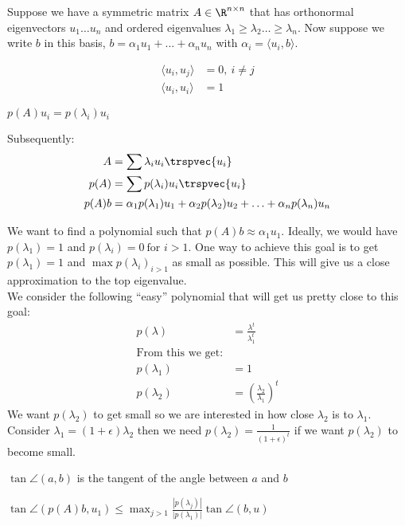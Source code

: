 Suppose we have a symmetric matrix $A \in \R^{n \times n}$ that has orthonormal eigenvectors $u_1 \ldots u_n$ and ordered eigenvalues $\lambda_1 \geq \lambda_2 \ldots \geq \lambda_n$. Now suppose we write $b$ in this basis, $b=\alpha_1 u_1 + ... + \alpha_n u_n$ with $\alpha_i = \langle u_i,b\rangle$. 
\begin{remark}
\begin{align*}
    \langle u_i,u_j\rangle &= 0, \ i \neq j \\
    \langle u_i, u_i\rangle &= 1 
\end{align*}
\end{remark}

\begin{remark}
$p(A)u_i = p(\lambda_i)u_i$
\end{remark}
Subsequently:
\begin{align*}
A &= \sum \lambda_i u_i \trspvec{u_i}  \\
p(A) &= \sum p(\lambda_i) u_i \trspvec{u_i} \\
 p(A)b &= \alpha_1 p(\lambda_1)u_1 + \alpha_2 p(\lambda_2) u_2 + \ldots + \alpha_n p(\lambda_n) u_n 
\end{align*}
 
We want to find a polynomial such that $p(A)b \approx \alpha_1 u_1$. Ideally, we would have $ p(\lambda_1) = 1$ and $ p(\lambda_i) = 0 \ \text{for } i > 1$. One way to achieve this goal is to get $p(\lambda_1) = 1$ and $\max{p(\lambda_i)}_{i>1}$ as small as possible. This will give us a close approximation to the top eigenvalue. \\

We consider the following ``easy'' polynomial that will get us pretty close to this goal:
\begin{align*}
    p(\lambda) &= \frac{\lambda^t}{\lambda_1 ^t} \\
    \text{From this we get:} \\
    p(\lambda_1) &= 1 \\
    p(\lambda_2) &= (\frac{\lambda_2}{\lambda_1})^t
\end{align*}
We want $p(\lambda_2)$ to get small so we are interested in how close $\lambda_2$ is to $\lambda_1$. Consider 
$\lambda_1 = (1 + \epsilon) \lambda_2$ then we need $p(\lambda_2) = \frac{1}{(1+\epsilon)^t}$ if we want $p(\lambda_2)$ to become small. 
\begin{remark}
$\tan \angle (a,b)$ is the tangent of the angle between $a$ and $b$
\end{remark}
\begin{theorem}[]
$\tan \angle(p(A)b, u_1) \leq \max_{j>1} \frac{|p(\lambda_j)|}{|p(\lambda_1)|} \tan \angle (b, u)$
\end{theorem}


